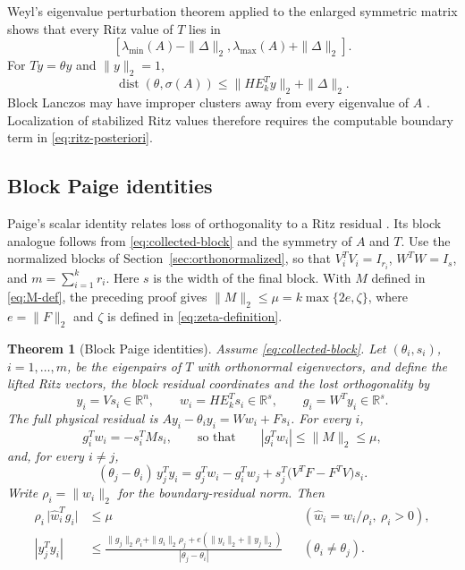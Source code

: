 \documentclass[11pt]{article}
\newtheorem{theorem}{Theorem}
\theoremstyle{definition}
\newcommand{\dist}{\operatorname{dist}}
\newcommand{\R}{\mathbb{R}}
\begin{document}
Weyl's eigenvalue perturbation theorem applied to the enlarged symmetric
matrix shows that every Ritz value of $T$ lies in
\[
 [\lambda_{\min}(A)-\|\Delta\|_2,
   \lambda_{\max}(A)+\|\Delta\|_2].
\]
For $Ty=\theta y$ and $\|y\|_2=1$,
\begin{equation}
 \dist(\theta,\sigma(A))
 \le\|HE_k^Ty\|_2+\|\Delta\|_2.
 \label{eq:ritz-posteriori}
\end{equation}
Block Lanczos may have improper clusters away from every eigenvalue of $A$
\cite{SimonovaTichy2025}.  Localization of stabilized Ritz values therefore
requires the computable boundary term in \eqref{eq:ritz-posteriori}.

\subsection{Block Paige identities}
\label{sec:block-paige}

Paige's scalar identity relates loss of orthogonality to a Ritz residual
\cite{Paige1976}.  Its block analogue follows from
\eqref{eq:collected-block} and the symmetry of $A$ and $T$.
Use the normalized blocks of Section~\ref{sec:orthonormalized}, so that
$V_i^TV_i=I_{r_i}$, $W^TW=I_s$, and $m=\sum_{i=1}^k r_i$.
Here $s$ is the width of the final block.  With $M$ defined in
\eqref{eq:M-def}, the preceding proof gives
$\|M\|_2\le\mu=k\max\{2e,\zeta\}$, where $e=\|F\|_2$ and
$\zeta$ is defined in \eqref{eq:zeta-definition}.

\begin{theorem}[Block Paige identities]
\label{thm:block-paige}
Assume \eqref{eq:collected-block}.  Let $(\theta_i,s_i)$, $i=1,\ldots,m$, be
the eigenpairs of $T$ with orthonormal eigenvectors, and define the lifted
Ritz vectors, the block residual coordinates and the lost orthogonality by
\[
 y_i=Vs_i\in\R^n,\qquad
 w_i=HE_k^Ts_i\in\R^s,\qquad
 g_i=W^Ty_i\in\R^s .
\]
The full physical residual is $Ay_i-\theta_i y_i=Ww_i+Fs_i$.
For every $i$,
\begin{equation}
 g_i^Tw_i=-s_i^TMs_i,
 \qquad\text{so that}\qquad
 |g_i^Tw_i|\le\|M\|_2\le\mu,
 \label{eq:block-paige-diag}
\end{equation}
and, for every $i\ne j$,
\begin{equation}
 (\theta_j-\theta_i)\,y_j^Ty_i
 =g_j^Tw_i-g_i^Tw_j+s_j^T\bigl(V^TF-F^TV\bigr)s_i .
 \label{eq:block-paige-offdiag}
\end{equation}
Write $\rho_i=\|w_i\|_2$ for the boundary-residual norm.  Then
\begin{equation}
 \begin{aligned}
 \rho_i\,\bigl|\hat w_i^Tg_i\bigr|&\le\mu
       &&(\hat w_i=w_i/\rho_i,\ \rho_i>0),\\
 |y_j^Ty_i|&\le
 \frac{\|g_j\|_2\rho_i+\|g_i\|_2\rho_j
             +e(\|y_i\|_2+\|y_j\|_2)}{|\theta_j-\theta_i|}
       &&(\theta_i\ne\theta_j).
 \end{aligned}
 \label{eq:block-paige-consequences}
\end{equation}
\end{theorem}
\end{document}
